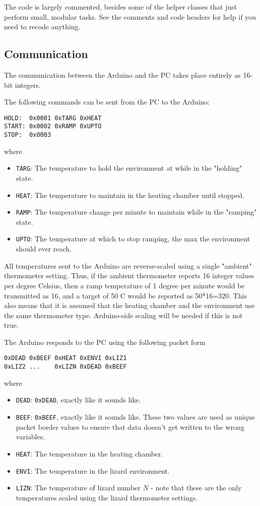\documentclass[twoside,a4paper]{refart}
\begin{document}
The code is largely commented, besides some of the helper classes that just perform small, modular tasks. See the comments and code headers for help if you need to recode anything.

\subsection{Communication}

The communication between the Arduino and the PC takes place entirely as 16-bit integers.

The following commands can be sent from the PC to the Arduino:
\begin{verbatim}
HOLD:  0x0001 0xTARG 0xHEAT
START: 0x0002 0xRAMP 0xUPTO
STOP:  0x0003
\end{verbatim}
where
\begin{itemize}
\item \verb|TARG|: The temperature to hold the environment at while in the "holding" state.
\item \verb|HEAT|: The temperature to maintain in the heating chamber until stopped.
\item \verb|RAMP|: The temperature change per minute to maintain while in the "ramping" state.
\item \verb|UPTO|: The temperature at which to stop ramping, the max the environment should ever reach.
\end{itemize}
All temperatures sent to the Arduino are reverse-scaled using a single "ambient" thermometer setting. Thus, if the ambient thermometer reports 16 integer values per degree Celsius, then a ramp temperature of 1 degree per minute would be transmitted as 16, and a target of 50 C would be reported as 50*16=320. This also means that it is assumed that the heating chamber and the environment use the same thermometer type. Arduino-side scaling will be needed if this is not true.
   
The Arduino responds to the PC using the following packet form
\begin{verbatim}
0xDEAD 0xBEEF 0xHEAT 0xENVI 0xLIZ1
0xLIZ2 ...    0xLIZN 0xDEAD 0xBEEF
\end{verbatim}
where
\begin{itemize}
\item \verb|DEAD|: \verb|0xDEAD|, exactly like it sounds like.
\item \verb|BEEF|: \verb|0xBEEF|, exactly like it sounds like. These two values are used as unique packet border values to ensure that data doesn't get written to the wrong variables.
\item \verb|HEAT|: The temperature in the heating chamber.
\item \verb|ENVI|: The temperature in the lizard environment.
\item \verb|LIZN|: The temperature of lizard number $N$ - note that these are the only temperatures scaled using the lizard thermometer settings.
\end{itemize}
\end{document}
